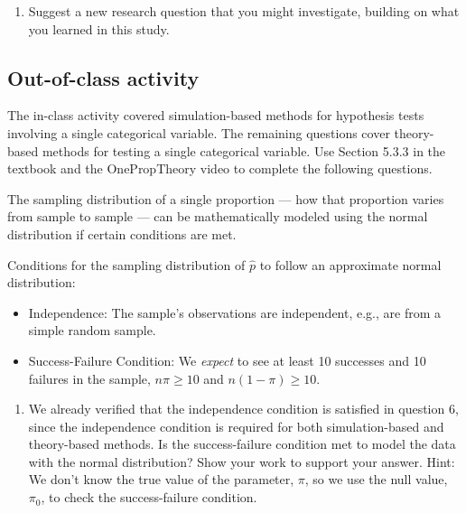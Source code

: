 \documentclass[
]{report}
\providecommand{\tightlist}{%
  \setlength{\itemsep}{0pt}\setlength{\parskip}{0pt}}
\begin{document}
\begin{enumerate}
\def\labelenumi{\arabic{enumi}.}
\setcounter{enumi}{27}
\tightlist
\item
  Suggest a new research question that you might investigate, building on what you learned in this study.
\end{enumerate}

\vspace{.6in}

\newpage

\hypertarget{out-of-class-activity-5}{%
\subsection{Out-of-class activity}\label{out-of-class-activity-5}}

The in-class activity covered simulation-based methods for hypothesis tests involving a single categorical variable. The remaining questions cover theory-based methods for testing a single categorical variable. Use Section 5.3.3 in the textbook and the OnePropTheory video to complete the following questions.

The sampling distribution of a single proportion --- how that proportion varies from sample to sample --- can be mathematically modeled using the normal distribution if certain conditions are met.

Conditions for the sampling distribution of \(\hat{p}\) to follow an approximate normal distribution:

\begin{itemize}
\item
  Independence: The sample's observations are independent, e.g., are from a simple random sample.
\item
  Success-Failure Condition: We \emph{expect} to see at least 10 successes and 10 failures in the sample, \(n\pi≥10\) and \(n(1-\pi)≥10\).
\end{itemize}

\begin{enumerate}
\def\labelenumi{\arabic{enumi}.}
\tightlist
\item
  We already verified that the independence condition is satisfied in question 6, since the independence condition is required for both simulation-based and theory-based methods. Is the success-failure condition met to model the data with the normal distribution? Show your work to support your answer. Hint: We don't know the true value of the parameter, \(\pi\), so we use the null value, \(\pi_0\), to check the success-failure condition.
\end{enumerate}
\end{document}
